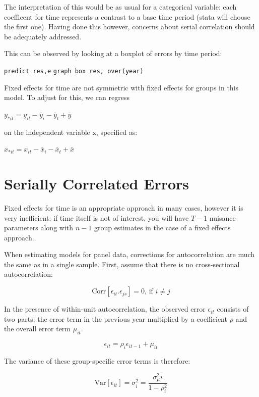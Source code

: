\documentclass[12pt]{article}
\begin{document}
The interpretation of this would be as usual for a categorical
variable: each coefficent for time represents a contrast to a base
time period (stata will choose the first one). Having done this
however, concerns about serial correlation should be adequately
addressed. 

 This can be observed by looking at a boxplot of errors by
 time period:

 \texttt{predict res,e}
 \texttt{graph box res, over(year)}


Fixed effects for time are not symmetric with fixed effects for groups
in this model. To adjust for this, we can regress 

$y_{*it}= y_{it}-\bar{y}_{i}-\bar{y}_{t}+\bar{y}$

on the independent variable x, specified as: 

$x_{*it}= x_{it}-\bar{x}_{i}-\bar{x}_{t}+\bar{x}$


\section{Serially Correlated Errors}

Fixed effects for time is an appropriate approach in many cases,
however it is very inefficient: if time itself is not of interest, you
will have $T-1$ nuisance parameters along with $n-1$ group estimates
in the case of a fixed effects approach. 

When estimating models for panel data, corrections for autocorrelation
are much the same as in a single sample. First, assume that there is
no cross-sectional autocorrelation:

\begin{equation*}
  \label{eq:noauto}
  \text{Corr}[\epsilon_{it}.\epsilon_{js}]=0 \text{, if } i \neq j
\end{equation*}

In the presence of within-unit autocorrelation, the observed error $\epsilon_{it}$
consists of two parts: the error term in the previous year multiplied
by a coefficient $\rho$ and the overall error term $\mu_{it}$.

\begin{equation*}
  \label{eq:ar1}
  \epsilon_{it}=\rho_i \epsilon_{it-1}+\mu_{it}
\end{equation*}

The variance of these group-specific error terms is therefore:

\begin{equation*}
  \text{Var}[\epsilon_{it}]=\sigma^2_i=\frac{\sigma^2 _\mu i}{1-\rho^2_i}
\end{equation*}
\end{document}

